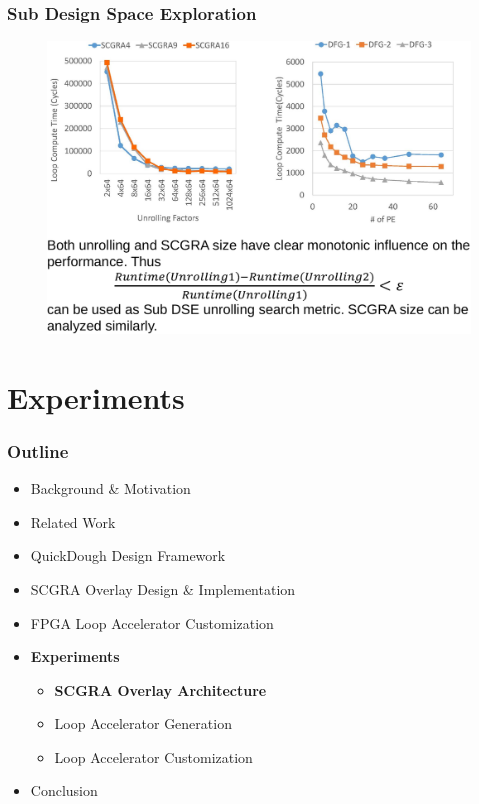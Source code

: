 \documentclass[accentcolor=tud1a,colorbacktitle,inverttitle,landscape,german,presentation,t]{tudbeamer}
\begin{document}
  \begin{frame}
  \frametitle{Sub Design Space Exploration}
  \vspace{-0.7em}
  \begin{figure}
     \includegraphics[width=.8\linewidth]{sub-dse}
  \end{figure}
  \end{frame}

\section{Experiments}
  \begin{frame}
  \frametitle{Outline}
  \begin{itemize}
  \setlength{\itemsep}{6pt}
  \item Background \& Motivation
  \item Related Work
  \item QuickDough Design Framework
  \item SCGRA Overlay Design \& Implementation
  \item FPGA Loop Accelerator Customization
  \item \textbf{Experiments}
  \begin{itemize}
    \setlength{\itemsep}{6pt}
    \item \textbf{SCGRA Overlay Architecture}
    \item Loop Accelerator Generation
    \item Loop Accelerator Customization
  \end{itemize}
  \item Conclusion
  \end{itemize}
  \end{frame}
\end{document}
